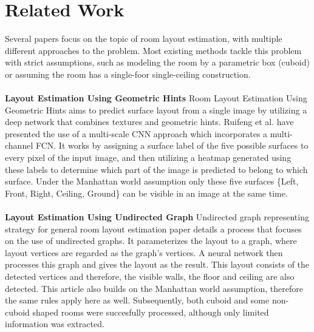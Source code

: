 \section{Related Work}
\label{sec:relatedwork}

Several papers focus on the topic of room layout estimation, with multiple
different approaches to the problem. Most existing methods tackle this problem
with strict assumptions, such as modeling the room by a parametric box (cuboid)
or assuming the room has a single-foor single-ceiling construction.

\paragraph{}

\textbf{Layout Estimation Using Geometric Hints} Room Layout Estimation Using
Geometric Hints\cite{8451365} aims to predict surface layout from a single image
by utilizing a deep network that combines textures and geometric hints. 
Ruifeng et al. \cite{8451365} have presented the use of a multi-scale CNN
approach which incorporates a multi-channel FCN. It works by assigning a surface
label of the five possible surfaces to every pixel of the input image, and then
utilizing a heatmap generated using these labels to determine which part of the
image is predicted to belong to which surface. Under the Manhattan world 
assumption\cite{790349} only these five surfaces \{Left, Front, Right, Ceiling,
Ground\} can be visible in an image at the same time.

\paragraph{}

\textbf{Layout Estimation Using Undirected Graph}
Undirected graph representing strategy for general room layout estimation\cite{YAO2023103963}
paper details a process that focuses on the use of undirected graphs. It parameterizes the layout to a graph, where layout vertices are regarded as the graph's vertices. A neural network then processes this graph and gives the layout as the result. This layout consists of the detected vertices and therefore, the visible walls, the floor and ceiling are also detected. This article also builds on the Manhattan world assumption\cite{790349}, therefore the same rules apply here as well. Subsequently, both cuboid and some non-cuboid shaped rooms were succesfully processed, although only limited information was extracted.